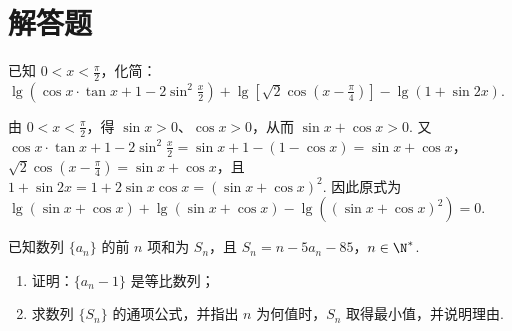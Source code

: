 \section{解答题}

\begin{problem}
已知 \(0 < x < \frac{\pi}{2}\)，化简： \(\lg \left(\cos x \cdot \tan x + 1 - 2 \sin^2 \frac{x}{2}\right) + \lg \left[ \sqrt{2} \cos \left( x - \frac{\pi}{4} \right) \right] - \lg (1 + \sin 2x)\).
\end{problem}

\begin{solution}
由 \(0 < x < \frac{\pi}{2}\)，得 \(\sin x>0\)、\(\cos x>0\)，从而 \(\sin x+\cos x>0\). 又
\(\cos x\cdot\tan x+1-2\sin^2\frac{x}{2}=\sin x+1-(1-\cos x)=\sin x+\cos x\)，
\(\sqrt{2}\cos\left(x-\frac{\pi}{4}\right)=\sin x+\cos x\)，且
\(1+\sin 2x=1+2\sin x\cos x=(\sin x+\cos x)^2\).
因此原式为 \(\lg(\sin x+\cos x)+\lg(\sin x+\cos x)-\lg\left((\sin x+\cos x)^2\right)=0\).
\end{solution}

\begin{problem}
已知数列 \(\{a_{n}\}\) 的前 \(n\) 项和为 \(S_{n}\)，且 \(S_{n} = n - 5a_{n} - 85\)，\(n \in \N^*\).

\begin{enumerate}
\item 证明：\(\{a_{n}-1\}\) 是等比数列；
\item 求数列 \(\{S_n\}\) 的通项公式，并指出 \(n\) 为何值时，\(S_n\) 取得最小值，并说明理由.
\end{enumerate}
\end{problem}

